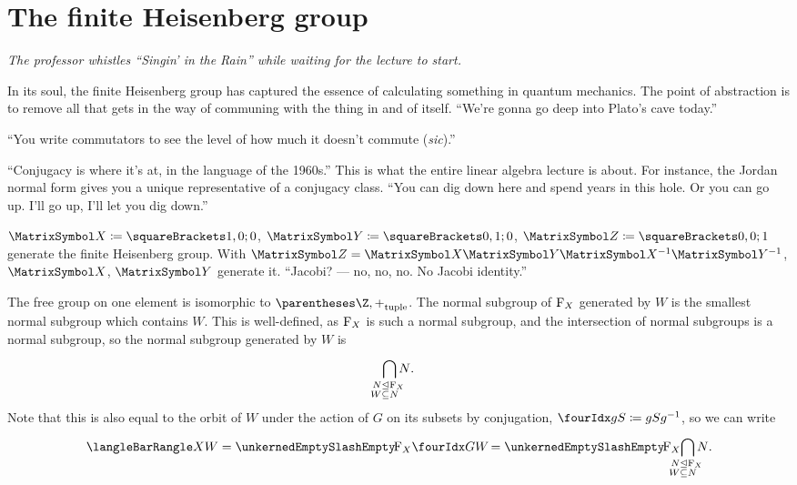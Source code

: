 \documentclass[10pt, a4paper, twoside]{lecturenotes}
\begin{document}
\section{The finite Heisenberg group}
\begin{lecture}[date=2013-03-14, official=true]
\emph{The professor whistles ``Singin' in the Rain'' while waiting for the lecture to start.}

In its soul, the finite Heisenberg group has captured the essence of calculating something in quantum mechanics. The point of abstraction is to remove all that gets in the way of communing with the thing in and of itself. 
``We're gonna go deep into Plato's cave today.''

``You write commutators to see the level of how much it doesn't commute (\emph{sic}).''

 ``Conjugacy is where it's at, in the language of the 1960s.'' This is what the entire linear algebra lecture is about. For instance, the Jordan normal form gives you a unique representative of a conjugacy class. ``You can dig down here and spend years in this hole. Or you can go up. I'll go up, I'll let you dig down.''

$\matX\DefineAs\Helt 1 0 0$, $\matY\DefineAs\Helt 0 1 0$, $\matZ\DefineAs\Helt 0 0 1$ generate the finite Heisenberg group. With $\matZ=\matX\matY\matX^{-1}\matY^{-1}$, $\matX$, $\matY$ generate it. ``Jacobi? --- no, no, no. No Jacobi identity.'' 

The free group on one element is isomorphic to $\tuple{\Z,+}$. The normal subgroup of $\operatorname{F}_{X}$ generated by $W$ is the smallest normal subgroup which contains $W$. This is well-defined, as $\operatorname{F}_{X}$ is such a normal subgroup, and the intersection of normal subgroups is a normal subgroup, so the normal subgroup generated by $W$ is
\begin{equation*}
  \IntersectionOver {
    \LongDomainSpec{
      \mathllap{N\NormalSubgroup} \mathrlap{\FreeGroup X}\\
      \mathllap{W\Subset} \mathrlap{N}
    }
  } N\text{.}
\end{equation*}
Note that this is also equal to the orbit of $W$ under the action of $G$ on its subsets by conjugation, $\LeftConjugationAction g S \DefineAs g S g^{-1}$, so we can write
\begin{equation*}
\GroupPresentation{X}{W} = \QuotientGroup{\FreeGroup X}{\LeftConjugationAction G W} = \QuotientGroup{\FreeGroup X}{
  \IntersectionOver {
    \LongDomainSpec{
      \mathllap{N\NormalSubgroup} \mathrlap{\FreeGroup X}\\
      \mathllap{W\Subset} \mathrlap{N}
    }
  } N\text{.}
}
\end{equation*}


\end{lecture}
\end{document}

